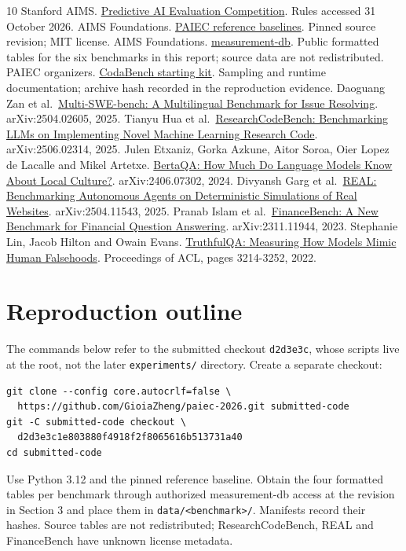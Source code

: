 \documentclass{article}
\begin{document}
\label{main-end}
\clearpage
\begin{thebibliography}{10}
Stanford AIMS. \href{https://aims.stanford.edu/competition}{Predictive AI Evaluation Competition}. Rules accessed 31 October 2026.
AIMS Foundations. \href{https://github.com/aims-foundations/paiec_baseline/tree/cc88a959c1e5e7462f31a9215baba066ce6d6e2b}{PAIEC reference baselines}. Pinned source revision; MIT license.
AIMS Foundations. \href{https://huggingface.co/datasets/aims-foundations/measurement-db/tree/54074453da7b9911be0f48e4c560be547bc84d21}{measurement-db}. Public formatted tables for the six benchmarks in this report; source data are not redistributed.
PAIEC organizers. \href{https://www.codabench.org/datasets/download/4ae12cd5-cc62-4c11-bad5-d9a51381b39b/}{CodaBench starting kit}. Sampling and runtime documentation; archive hash recorded in the reproduction evidence.
Daoguang Zan et al.~\href{https://arxiv.org/abs/2504.02605}{Multi-SWE-bench: A Multilingual Benchmark for Issue Resolving}. arXiv:2504.02605, 2025.
Tianyu Hua et al.~\href{https://arxiv.org/abs/2506.02314}{ResearchCodeBench: Benchmarking LLMs on Implementing Novel Machine Learning Research Code}. arXiv:2506.02314, 2025.
Julen Etxaniz, Gorka Azkune, Aitor Soroa, Oier Lopez de Lacalle and Mikel Artetxe. \href{https://arxiv.org/abs/2406.07302}{BertaQA: How Much Do Language Models Know About Local Culture?}. arXiv:2406.07302, 2024.
Divyansh Garg et al.~\href{https://arxiv.org/abs/2504.11543}{REAL: Benchmarking Autonomous Agents on Deterministic Simulations of Real Websites}. arXiv:2504.11543, 2025.
Pranab Islam et al.~\href{https://arxiv.org/abs/2311.11944v1}{FinanceBench: A New Benchmark for Financial Question Answering}. arXiv:2311.11944, 2023.
Stephanie Lin, Jacob Hilton and Owain Evans. \href{https://aclanthology.org/2022.acl-long.229/}{TruthfulQA: Measuring How Models Mimic Human Falsehoods}. Proceedings of ACL, pages 3214-3252, 2022.
\end{thebibliography}
\clearpage
\appendix
\section{Reproduction outline}
The commands below refer to the submitted checkout \texttt{d2d3e3c}, whose
scripts live at the root, not the later \texttt{experiments/} directory.
Create a separate checkout:
\begin{verbatim}
git clone --config core.autocrlf=false \
  https://github.com/GioiaZheng/paiec-2026.git submitted-code
git -C submitted-code checkout \
  d2d3e3c1e803880f4918f2f8065616b513731a40
cd submitted-code
\end{verbatim}
Use Python 3.12 and the pinned reference baseline. Obtain the four formatted
tables per benchmark through authorized measurement-db access at the revision
in Section 3 and place them in \texttt{data/<benchmark>/}. Manifests record
their hashes. Source tables are not redistributed; ResearchCodeBench, REAL
and FinanceBench have unknown license metadata.
\end{document}
